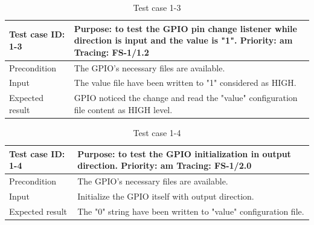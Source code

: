 \begin{table}[H]
	\caption{Test case 1-3}
	\label{table:TCase-FS1-3}
	\begin{center}
		\renewcommand{\arraystretch}{1.8}
		\begin{tabu} 
			to 0.9 \textwidth
			{  X[0.3, l] X[l] }
			\toprule
			Test case ID: 1-3 & Purpose: to test the GPIO pin change listener while direction is input and the value is "1". \newline Priority: am \newline Tracing: FS-1/1.2 \\ \midrule
			Precondition      & The GPIO's necessary files are available.                                                                                                     \\
			Input             & The value file have been written to "1" considered as HIGH.                                                                                   \\
			Expected result   & GPIO noticed the change and read the "value" configuration file content as HIGH level.                                                        \\ \bottomrule
		\end{tabu}
	\end{center}
\end{table} 

\begin{table}[H]
	\caption{Test case 1-4}
	\label{table:TCase-FS1-4}
	\begin{center}
		\renewcommand{\arraystretch}{1.8}
		\begin{tabu} 
			to 0.9 \textwidth
			{  X[0.3, l] X[l] }
			\toprule
			Test case ID: 1-4 & Purpose: to test the GPIO initialization in output direction. \newline Priority: am \newline Tracing: FS-1/2.0 \\ \midrule
			Precondition      & The GPIO's necessary files are available.                                                                      \\
			Input             & Initialize the GPIO itself with output direction.                                                              \\
			Expected result   & The "0" string have been written to "value" configuration file.                                                \\ \bottomrule
		\end{tabu}
	\end{center}
\end{table} 

